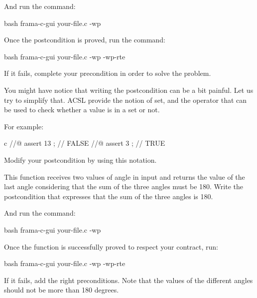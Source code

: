 And run the command:


\begin{CodeBlock}{bash}
frama-c-gui your-file.c -wp
\end{CodeBlock}


Once the postcondition is proved, run the command:



\begin{CodeBlock}{bash}
frama-c-gui your-file.c -wp -wp-rte
\end{CodeBlock}



If it fails, complete your precondition in order to solve the problem.



You might have notice that writing the postcondition can be a bit painful.
Let us try to simplify that. ACSL provide the notion of set, and the operator
 that can be used to check whether a value is
in a set or not.


For example:


\begin{CodeBlock}{c}
//@ assert 13  ; // FALSE
//@ assert 3   ; // TRUE
\end{CodeBlock}



Modify your postcondition by using this notation.






This function receives two values of angle in input and returns the value
of the last angle considering that the sum of the three angles must be 180.
Write the postcondition that expresses that the sum of the three angles is
180.





And run the command:


\begin{CodeBlock}{bash}
frama-c-gui your-file.c -wp
\end{CodeBlock}


Once the function is successfully proved to respect your contract, run:


\begin{CodeBlock}{bash}
frama-c-gui your-file.c -wp -wp-rte
\end{CodeBlock}



If it fails, add the right preconditions. Note that the values of the different
angles should not be more than 180 degrees.
